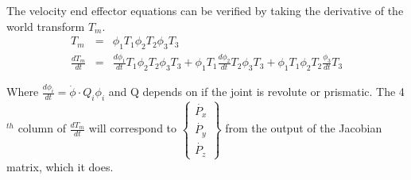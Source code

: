 \begin{homeworkProblem}
The velocity end effector equations can be verified by taking the derivative of the world transform $T_m.$ 
\begin{eqnarray}
T_m&=&\phi_1T_1\phi_2T_2\phi_3T_3 \\
\frac{dT_m}{dt}&=&\frac{d\phi_1}{dt}T_1\phi_2T_2\phi_3T_3+\phi_1T_1\frac{d\phi_2}{dt}T_2\phi_3T_3+\phi_1T_1\phi_2T_2\frac{\phi_3}{dt}T_3
\end{eqnarray}

Where $\frac{d\phi_i}{dt}=\dot{\phi}\cdot Q_i\phi_i$ and Q depends on if the joint is revolute or prismatic. The 4$^{th}$ column of $\frac{dT_m}{dt}$ will correspond to $\begin{Bmatrix}
\dot{P_x} \\
\dot{P_y} \\
\dot{P_z}\end{Bmatrix}$ from the output of the Jacobian matrix, which it does.
\end{homeworkProblem}

